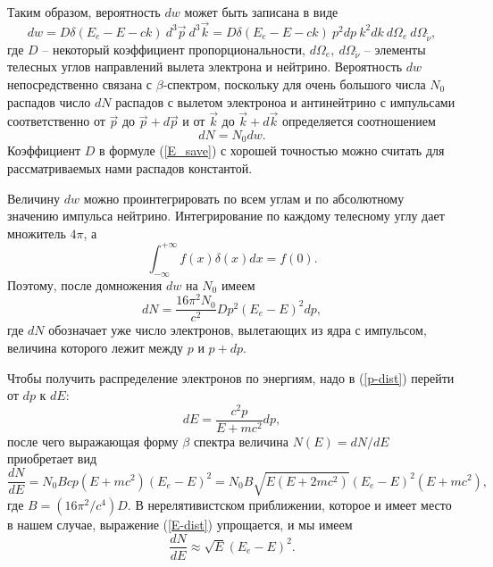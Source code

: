 \documentclass{physlab}
\begin{document}
Таким образом, вероятность $dw$ может быть записана в виде
\begin{equation}
dw = D \delta (E_e - E - ck) \  d^3 \vec{p} \  d^3 \vec{k} =  D \delta (E_e - E - ck) \ p^2 dp \ k^2 dk \ d\Omega_e \ d\Omega_{\tilde \nu}, 
\end{equation}
где $D$ -- некоторый коэффициент пропорциональности, $d\Omega_e,\ d\Omega_{\tilde \nu}$ -- элементы телесных углов направлений вылета электрона и нейтрино. Вероятность $dw$ непосредственно связана с $\beta$-спектром, поскольку для очень большого числа $N_0$ распадов число $dN$ распадов с вылетом электроноа и антинейтрино с импульсами соответственно от $\vec{p}$ до $\vec{p} + d\vec{p}$ и от $\vec{k}$ до $\vec{k} + d\vec{k}$ определяется соотношением 
\begin{equation}
dN = N_0 dw.
\end{equation}
Коэффициент $D$ в формуле (\ref{E_save}) с хорошей точностью можно считать для рассматриваемых нами распадов константой.

Величину $dw$ можно проинтегрировать по всем углам и по абсолютному значению импульса нейтрино. Интегрирование по каждому телесному углу дает множитель $4 \pi$, а 
\begin{equation}
\int_{- \infty} ^{+ \infty} f(x) \delta (x) dx = f(0).
\end{equation}
Поэтому, после домножения $dw$ на $N_0$ имеем
\begin{equation} \label{p-dist}
dN = \frac{16 \pi^2 N_0}{c^2}Dp^2(E_e - E)^2 dp, 
\end{equation}
где $dN$ обозначает уже число электронов, вылетающих из ядра с импульсом, величина которого лежит между $p$  и $p + dp$.

Чтобы получить распределение электронов по энергиям, надо в (\ref{p-dist}) перейти от $dp$ к $dE$:
\begin{equation}
dE = \frac{c^2 p}{E + mc^2} dp,
\end{equation}
после чего выражающая форму $\beta$ спектра величина $N(E) = dN/dE$ приобретает вид
\begin{equation} \label{E-dist}
\frac{dN}{dE} = N_0 B c p (E + mc^2)(E_e - E)^2 = N_0 B \sqrt{E (E + 2mc^2)} (E_e - E)^2 (E + mc^2), 
\end{equation}
где $B = (16 \pi^2 / c^4) D$. В нерелятивистском приближении, которое и имеет место в нашем случае, выражение (\ref{E-dist}) упрощается, и мы имеем
\begin{equation} \label{non-rel-E-dist}
\frac{dN}{dE} \approx \sqrt{E} (E_e - E)^2.
\end{equation}
\end{document}
